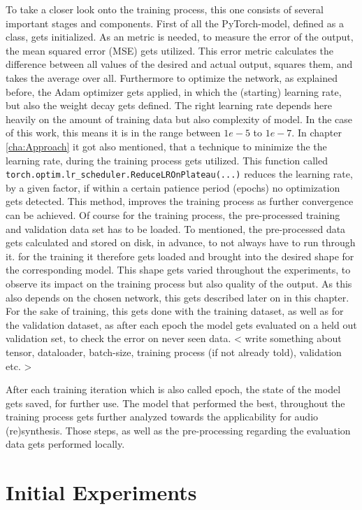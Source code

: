 To take a closer look onto the training process, this one consists of several important stages and components. First of all the PyTorch-model, defined as a class, gets initialized. As an metric is needed, to measure the error of the output, the mean squared error (MSE) gets utilized. This error metric calculates the difference between all values of the desired and actual output, squares them, and takes the average over all. Furthermore to optimize the network, as explained before, the Adam optimizer gets applied, in which the (starting) learning rate, but also the weight decay gets defined. The right learning rate depends here heavily on the amount of training data but also complexity of model. In the case of this work, this means it is in the range between $1e-5$ to $1e-7$. In chapter \ref{cha:Approach} it got also mentioned, that a technique to minimize the the learning rate, during the training process gets utilized. This function called \texttt{torch.optim.lr\_scheduler.ReduceLROnPlateau(...)} reduces the learning rate, by a given factor, if within a certain patience period (epochs) no optimization gets detected. This method, improves the training process as further convergence can be achieved. Of course for the training process, the pre-processed training and validation data set has to be loaded. To mentioned, the pre-processed data gets calculated and stored on disk, in advance, to not always have to run through it. for the training it therefore gets loaded and brought into the desired shape for the corresponding model. This shape gets varied throughout the experiments, to observe its impact on the training process but also quality of the output. As this also depends on the chosen network, this gets described later on in this chapter. For the sake of training, this gets done with the training dataset, as well as for the validation dataset, as after each epoch the model gets evaluated on a held out validation set, to check the error on never seen data.
< write something about tensor, dataloader, batch-size, training process (if not already told), validation etc. >

After each training iteration which is also called epoch, the state of the model gets saved, for further use. The model that performed the best, throughout the training process gets further analyzed towards the applicability for audio (re)synthesis. Those steps, as well as the pre-processing regarding the evaluation data gets performed locally. 

\section{Initial Experiments}


